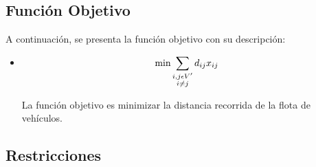 \documentclass[letter, 10pt]{article}
\begin{document}
\subsection{Función Objetivo}
A continuación, se presenta la función objetivo con su descripción:
\begin{itemize}
\item
\begin{equation*}
\hbox{min} \sum_{\substack{i,j \epsilon V' \\ i \neq j}} d_{ij} x_{ij}
\end{equation*}

La función objetivo es minimizar la distancia recorrida de la flota de vehículos.

\end{itemize}
\subsection{Restricciones}
\end{document}
